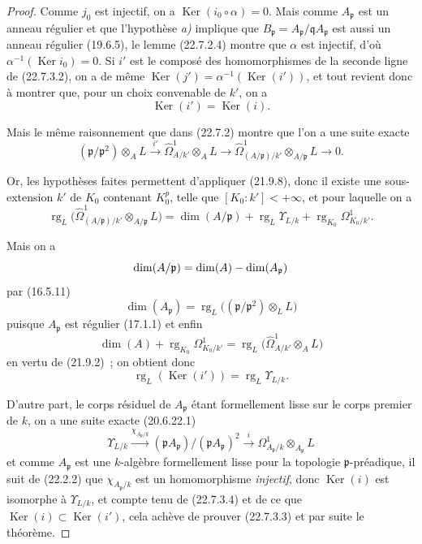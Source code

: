 \begin{proof}
Comme $j_0$ est injectif, on a $\operatorname{Ker}(i_0\circ\alpha)=0$. Mais comme
$A_{\mathfrak p}$ est un anneau régulier et que l'hypothèse \emph{a)} implique que
$B_{\mathfrak p}=A_{\mathfrak p}/\mathfrak qA_{\mathfrak p}$ est aussi un
anneau régulier (19.6.5), le lemme (22.7.2.4) montre que $\alpha$ est injectif,
d'où $\alpha^{-1}(\operatorname{Ker} i_0)=0$. Si $i'$ est le composé des homomorphismes de la
seconde ligne de (22.7.3.2), on a de même
$\operatorname{Ker}(j')=\alpha^{-1}(\operatorname{Ker}(i'))$, et tout revient donc à montrer que, pour un
choix convenable de $k'$, on a
\begin{equation}
\label{0.22.7.3.3-fr}
  \operatorname{Ker}(i')=\operatorname{Ker}(i).
  \tag{22.7.3.3}
\end{equation}

Mais le même raisonnement que dans (22.7.2) montre que l'on a une suite exacte
\[
  (\mathfrak p/\mathfrak p^2)\otimes_AL\xrightarrow{i'}
  \widehat\Omega^1_{A/k'}\otimes_AL\longrightarrow
  \widehat\Omega^1_{(A/\mathfrak p)/k'}\otimes_{A/\mathfrak p}L
  \longrightarrow0.
\]

Or, les hypothèses faites permettent d'appliquer (21.9.8), donc il existe une
sous-extension $k'$ de $K_0$ contenant $K_0^p$, telle que
$[K_0:k']<+\infty$, et pour laquelle on a
\[
  \operatorname{rg}_L\bigl(\widehat\Omega^1_{(A/\mathfrak p)/k'}
  \otimes_{A/\mathfrak p}L\bigr)
  =\dim(A/\mathfrak p)+\operatorname{rg}_L\Upsilon_{L/k}
  +\operatorname{rg}_{K_0}\Omega^1_{K_0/k'}.
\]

Mais on a
\[
  \dim(A/\mathfrak p)=\dim(A)-\dim(A_{\mathfrak p})
\]
par (16.5.11)
\[
  \dim(A_{\mathfrak p})
  =\operatorname{rg}_L\bigl((\mathfrak p/\mathfrak p^2)\otimes_LL\bigr)
\]
puisque $A_{\mathfrak p}$ est régulier (17.1.1) et enfin
\[
  \dim(A)+\operatorname{rg}_{K_0}\Omega^1_{K_0/k'}
  =\operatorname{rg}_L\bigl(\widehat\Omega^1_{A/k'}\otimes_AL\bigr)
\]
en vertu de (21.9.2)~; on obtient donc
\begin{equation}
\label{0.22.7.3.4-fr}
  \operatorname{rg}_L(\operatorname{Ker}(i'))=\operatorname{rg}_L\Upsilon_{L/k}.
  \tag{22.7.3.4}
\end{equation}

D'autre part, le corps résiduel de $A_{\mathfrak p}$ étant formellement lisse
sur le corps premier de $k$, on a une suite exacte (20.6.22.1)
\[
  \Upsilon_{L/k}\xrightarrow{\chi_{A_{\mathfrak p}/k}}
  (\mathfrak pA_{\mathfrak p})/(\mathfrak pA_{\mathfrak p})^2
  \xrightarrow{i}\Omega^1_{A_{\mathfrak p}/k}
  \otimes_{A_{\mathfrak p}}L
\]
et comme $A_{\mathfrak p}$ est une $k$-algèbre formellement lisse pour la
topologie $\mathfrak p$-préadique, il suit de (22.2.2) que
$\chi_{A_{\mathfrak p}/k}$ est un homomorphisme \emph{injectif}, donc $\operatorname{Ker}(i)$ est
isomorphe à $\Upsilon_{L/k}$, et compte tenu de (22.7.3.4) et de ce que
$\operatorname{Ker}(i)\subset\operatorname{Ker}(i')$, cela achève de prouver (22.7.3.3) et par suite le
théorème.
\end{proof}

